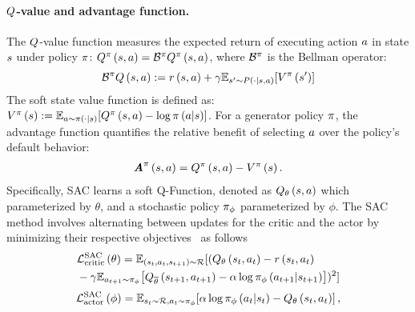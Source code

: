 \paragraph{$Q$-value and advantage function.} 
The $Q$-value function measures the expected return of executing action $a$ in state $s$ under policy $\pi$:
$Q^{\pi} \left( {s,a} \right)  = \mathcal{B}^{\pi}Q^{\pi} \left( {s,a} \right) $, 
where $\mathcal{B}^{\pi}$ is the Bellman operator:
\begin{equation*}
    \mathcal{B}^{\pi}Q \left( {s,a} \right)  := r \left( {s,a} \right)  + \gamma \mathbb{E}_{s' \sim P \left( {\cdot|s,a} \right) }\!\left[V^{\pi} \left( {s'} \right) \right]
\end{equation*}
The soft state value function is defined as:
$V^{\pi} \left( {s} \right) := \mathbb{E}_{a\sim\pi \left( {\cdot|s} \right) }\!\left[Q^{\pi} \left( {s,a} \right) - {\log \pi \left( {a|s} \right) }\right]$. 
For a generator policy $\pi$, the advantage function \citep{sutton1999policy} %
quantifies the relative benefit of selecting $a$ over the policy's default behavior:
\begin{align}\label{eq:advantage}
   \textbf{\em A}^{\pi} \left( {s,a} \right)  = Q^{\pi} \left( {s,a} \right)  - V^{\pi} \left( {s} \right) .
\end{align}
Specifically, SAC learns a soft Q-Function, denoted as $Q_{\theta} \left( {s,a} \right) $ which parameterized by $\theta$, 
and a stochastic policy $\pi_{\phi}$ parameterized by $\phi$. The SAC method involves alternating between updates for the critic and the actor by minimizing their respective objectives~\citep{lee2022offline} as follows
\begin{align*}
&\mathcal{L}_{\text{critic}}^{\text{SAC}} \left( {\theta} \right) =\mathbb{E}_{ \left( {s_t,a_t,s_{t+1}} \right) \sim\mathcal{R}}[(Q_{\theta} \left( {s_t,a_t} \right) -r \left( {s_t,a_t} \right) \\&-\gamma{
    \mathbb{E}_{\ensuremath{a}_{t+1} \sim \ensuremath{\pi}_{\phi}}\!\left[\ensuremath{Q}_{\overline{\theta}}\ensuremath{ \left( {s_{t+1},a_{t+1}} \right) }-\alpha\log\ensuremath{\pi}_{\phi}\ensuremath{ \left( {a_{t+1}|s_{t+1}} \right) }\right]})^2]
\end{align*}
\begin{align*}
\mathcal{L}_{\text{actor}}^{\text{SAC}} \left( {\phi} \right) =\mathbb{E}_{s_t\sim\mathcal{R},a_t\sim\pi_{\phi}}\!\left[\alpha\log\pi_{\phi} \left( {a_t|s_t} \right) -Q_{\theta} \left( {s_t,a_t} \right) \right],
\end{align*}
